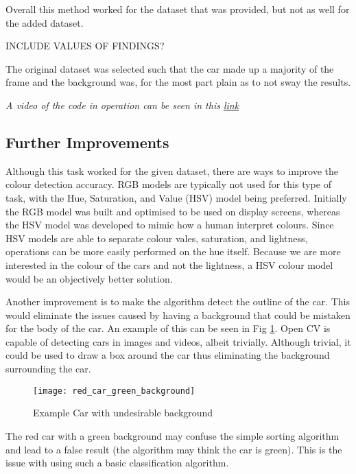 \documentclass[conference]{IEEEtran}
\begin{document}
Overall this method worked for the dataset that was provided, but not as well for the added dataset. 

INCLUDE VALUES OF FINDINGS?


The original dataset was selected such that the car made up a majority of the frame and the background was, for the most part plain as to not sway the results.

\textit{A video of the code in operation can be seen in this \href{https://github.com/LukeDWaller99/Aint308}{link}}


\subsection{Further Improvements}
Although this task worked for the given dataset, there are ways to improve the colour detection accuracy. RGB models are typically not used for this type of task, with the Hue, Saturation, and Value (HSV) model being preferred. Initially the RGB model was built and optimised to be used on display screens, whereas the HSV model was developed to mimic how a human interpret colours. Since HSV models are able to separate colour vales, saturation, and lightness, operations can be more easily performed on the hue itself. Because we are more interested in the colour of the cars and not the lightness, a HSV colour model would be an objectively better solution. \cite{ref:HSV_vs_RGB}

Another improvement is to make the algorithm detect the outline of the car. This would eliminate the issues caused by having a background that could be mistaken for the body of the car. An example of this can be seen in Fig \ref{fig:red_car_green_background}. Open CV is capable of detecting cars in images and videos, albeit trivially. Although trivial, it could be used to draw a box around the car thus eliminating the background surrounding the car. \cite{ref:Vehicle_detection_in_python} 

\begin{figure}
\centerline{\texttt{[image: red\_car\_green\_background]}}
\caption{Example Car with undesirable background}
\label{fig:red_car_green_background}
\end{figure}

The red car with a green background may confuse the simple sorting algorithm and lead to a false result (the algorithm may think the car is green). This is the issue with using such a basic classification algorithm.
\end{document}
